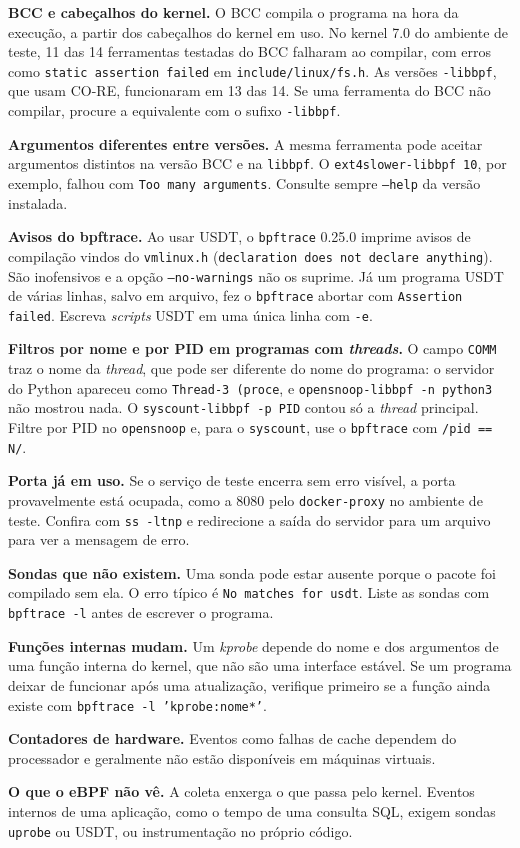 \textbf{BCC e cabeçalhos do kernel.} O BCC compila o programa na hora da execução, a partir dos cabeçalhos do kernel em uso. No kernel 7.0 do ambiente de teste, 11 das 14 ferramentas testadas do BCC falharam ao compilar, com erros como \texttt{static assertion failed} em \texttt{include/linux/fs.h}. As versões \texttt{-libbpf}, que usam CO-RE, funcionaram em 13 das 14. Se uma ferramenta do BCC não compilar, procure a equivalente com o sufixo \texttt{-libbpf}.

\textbf{Argumentos diferentes entre versões.} A mesma ferramenta pode aceitar argumentos distintos na versão BCC e na \texttt{libbpf}. O \texttt{ext4slower-libbpf 10}, por exemplo, falhou com \texttt{Too many arguments}. Consulte sempre \texttt{--help} da versão instalada.

\textbf{Avisos do bpftrace.} Ao usar USDT, o \texttt{bpftrace} 0.25.0 imprime avisos de compilação vindos do \texttt{vmlinux.h} (\texttt{declaration does not declare anything}). São inofensivos e a opção \texttt{--no-warnings} não os suprime. Já um programa USDT de várias linhas, salvo em arquivo, fez o \texttt{bpftrace} abortar com \texttt{Assertion failed}. Escreva \textit{scripts} USDT em uma única linha com \texttt{-e}.

\textbf{Filtros por nome e por PID em programas com \textit{threads}.} O campo \texttt{COMM} traz o nome da \textit{thread}, que pode ser diferente do nome do programa: o servidor do Python apareceu como \texttt{Thread-3 (proce}, e \texttt{opensnoop-libbpf -n python3} não mostrou nada. O \texttt{syscount-libbpf -p PID} contou só a \textit{thread} principal. Filtre por PID no \texttt{opensnoop} e, para o \texttt{syscount}, use o \texttt{bpftrace} com \texttt{/pid == N/}.

\textbf{Porta já em uso.} Se o serviço de teste encerra sem erro visível, a porta provavelmente está ocupada, como a 8080 pelo \texttt{docker-proxy} no ambiente de teste. Confira com \texttt{ss -ltnp} e redirecione a saída do servidor para um arquivo para ver a mensagem de erro.

\textbf{Sondas que não existem.} Uma sonda pode estar ausente porque o pacote foi compilado sem ela. O erro típico é \texttt{No matches for usdt}. Liste as sondas com \texttt{bpftrace -l} antes de escrever o programa.

\textbf{Funções internas mudam.} Um \textit{kprobe} depende do nome e dos argumentos de uma função interna do kernel, que não são uma interface estável. Se um programa deixar de funcionar após uma atualização, verifique primeiro se a função ainda existe com \texttt{bpftrace -l 'kprobe:nome*'}.

\textbf{Contadores de hardware.} Eventos como falhas de cache dependem do processador e geralmente não estão disponíveis em máquinas virtuais.

\textbf{O que o eBPF não vê.} A coleta enxerga o que passa pelo kernel. Eventos internos de uma aplicação, como o tempo de uma consulta SQL, exigem sondas \texttt{uprobe} ou USDT, ou instrumentação no próprio código.
